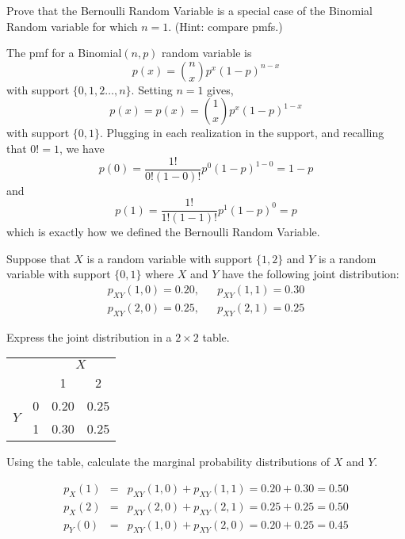\documentclass[addpoints,12pt]{exam}
\begin{document}
\begin{questions}
\question Prove that the Bernoulli Random Variable is a special case of the Binomial Random variable for which $n = 1$.	 (Hint: compare pmfs.)
	\begin{solution}
		The pmf for a Binomial$(n,p)$ random variable is
		$$p(x) = {n \choose x} p^x (1-p)^{n-x}$$
		with support $\{0, 1, 2\hdots, n\}$. Setting $n=1$ gives,
		$$p(x) = p(x) = {1 \choose x} p^x (1-p)^{1-x}$$
		with support $\{0,1\}$. Plugging in each realization in the support, and recalling that $0! = 1$, we have
			$$p(0) = \frac{1!}{0!(1-0)!} p^0 (1-p)^{1-0} = 1 - p$$
		and
		$$p(1) = \frac{1!}{1!(1-1)!} p^1 (1-p)^0 = p$$
		which is exactly how we defined the Bernoulli Random Variable.
	\end{solution}
	
\question Suppose that $X$ is a random variable with support $\{1,2\}$ and $Y$ is a random variable with support $\{0,1\}$ where $X$ and $Y$ have the following joint distribution:
			\begin{eqnarray*}
				p_{XY}(1,0) = 0.20, && p_{XY}(1,1) = 0.30 \\
				p_{XY}(2,0) = 0.25, && p_{XY}(2,1) = 0.25
			\end{eqnarray*}
	\begin{parts}
		\item Express the joint distribution in a $2\times 2$ table.
			\begin{solution}
			\begin{center}
\begin{tabular}{|cc|cc|}
\hline
&&\multicolumn{2}{c|}{$X$}\\
&&1 & 2\\
\hline
\multirow{2}{*}{$Y$}
&0& \multicolumn{1}{|c}{0.20} & 0.25\\
&1& \multicolumn{1}{|c}{0.30} & 0.25\\
\hline
\end{tabular}
\end{center}
			\end{solution}
		\item Using the table, calculate the marginal probability distributions of $X$ and $Y$.
			\begin{solution}
				\begin{eqnarray*}
					p_X(1) &=&p_{XY}(1,0) + p_{XY}(1,1)=0.20+0.30 = 0.50 \\
					p_X(2) &=&p_{XY}(2,0) + p_{XY}(2,1)=0.25 + 0.25 = 0.50 \\
					p_Y(0) &=&p_{XY}(1,0) + p_{XY}(2,0) = 0.20 + 0.25 = 0.45 \\

\end{eqnarray*}
\end{solution}
\end{parts}
\end{questions}
\end{document}
